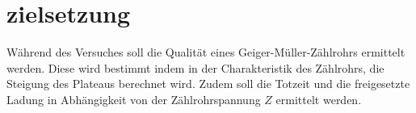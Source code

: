 \section{zielsetzung}
\label{sec:zielsetzung}
Während des Versuches soll die Qualität eines Geiger-Müller-Zählrohrs ermittelt werden.
Diese wird bestimmt indem in der Charakteristik des Zählrohrs, die Steigung des Plateaus berechnet wird.
Zudem soll die Totzeit und die freigesetzte Ladung in Abhängigkeit von der Zählrohrspannung $Z$ ermittelt werden.